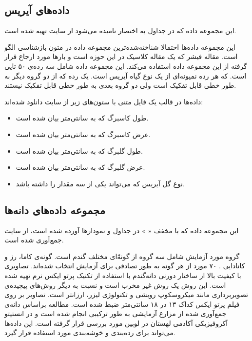 \subsection{
داده‌های آیریس
}

این مجموعه داده که در جداول به اختصار 
نامیده می‌شود از سایت 
\cite{uci_iris}
تهیه شده است.

این مجموعه داده‌ها احتمالا شناخته‌شده‌ترین مجموعه داده در متون بازشناسی الگو%
است. مقاله فیشر%
\cite{fisher1936use}
 که یک مقاله کلاسیک در این حوزه است و بارها مورد ارجاع قرار گرفته از این مجموعه داده استفاده می‌کند. این مجموعه داده شامل سه رده‌ی ۵۰ تایی است. که هر رده نمیونه‌ای از یک نوع گیاه آیریس است. یک رده که از دو گروه دیگر به طور خطی قابل تفکیک است ولی دو گروه بعدی به طور خطی قابل تفکیک نیستند.

داده‌ها در قالب یک فایل متنی با ستون‌های زیر از سایت 
دانلود شده‌اند:

\begin{itemize}
\item
{}
طول کاسبرگ که به سانتی‌متر بیان شده است.
\item
{}
عرض کاسبرگ که به سانتی‌متر بیان شده است.
\item
{}
طول گلبرگ که به سانتی‌متر بیان شده است.
\item
{}
عرض گلبرگ که به سانتی‌متر بیان شده است.
\item
{}
نوع گل آیریس که می‌تواند یکی از سه مقدار 
را داشته باشد.
\end{itemize}

\subsection{
مجموعه داده‌های دانه‌ها
}

این مجموعه داده که با مخفف «%
%
» در جداول و نمودارها آورده شده است، از سایت 
\cite{uci_seeds}
جمع‌آوری شده است.

گروه مورد آزمایش شامل سه گروه از گونه‌ّای مختلف گندم است. گونه‌ی کاما، رز و کانادایی%
%
. ۷۰ مورد از هر گونه به طور تصادفی برای آزمایش انتخاب شده‌اند. تصاویری با کیفیت بالا از ساختار دورنی دانه‌گندم با استفاده از تکنیک پرتو ایکس نرم%
تهیه شده است. این روش یک روش غیر مخرب است و نسبت به دیگر روش‌های پیچیده‌ی تصویربرداری مانند میکروسکوپ روبشی و تکنولوژی لیزر، ارزانتر است. تصاویر بر روی فیلم پرتو ایکس کداک ۱۳ در ۱۸ سانتی‌متر ضبط شده است. مطالعه براساس دانه‌ی جمع‌آوری شده از مزارع آزمایشی به طور ترکیبی انجام شده است و در انستیتو آکروفیزیکی آکادمی لهستان در لوبین مورد بررسی قرار گرفته است.%
این داده‌ها می‌تواند برای رده‌بندی و خوشه‌بندی مورد استفاده قرار گیرد.

